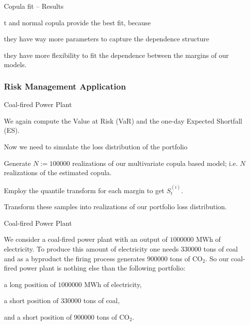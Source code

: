 {Copula fit -- Results}

t and normal copula provide the best fit,  because
\item they have way more parameters to capture the dependence
structure \item they have more flexibility to fit the dependence
between the margins of our models.

\subsubsection{Risk Management Application}

{Coal-fired Power Plant}

We again compute the Value at Risk (VaR) and the one-day Expected
Shortfall (ES).

Now we need to simulate the loss distribution of the portfolio

\item Generate $N:=100000$ realizations of our multivariate copula
based model; i.e. $N$ realizations of the estimated copula. \item
Employ the quantile transform for each margin to get $S_t^{(i)}$.
\item Transform these samples into realizations of our portfolio
loss distribution.


{Coal-fired Power Plant}

We consider a coal-fired power plant with an output of $1000000$
MWh of electricity. To produce this amount of electricity one
needs $330000$ tons of coal and as a byproduct the firing process
generates $900000$ tons of CO$_2$. So our coal-fired power plant
is nothing else than the following portfolio:
            \item a long position of $1000000$ MWh of electricity,
            \item a short position of $330000$ tons of coal,
            \item and a short position of $900000$ tons of CO$_2$.

